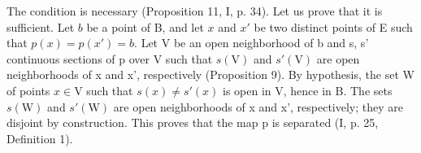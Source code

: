 The condition is necessary (Proposition 11, I, p. 34). Let us prove that it is sufficient. Let \(b\) be a point of B, and let \(x\) and \(x'\) be two distinct points of E such that \(p(x) = p(x') = b\). Let V be an open neighborhood of b and s, s' continuous sections of p over V such that \(s(\mathrm{V})\) and \(s'(\mathrm{V})\) are open neighborhoods of x and x', respectively (Proposition 9). By hypothesis, the set W of points \(x \in \mathrm{V}\) such that \(s(x) \ne s'(x)\) is open in V, hence in B. The sets \(s(\mathrm{W})\) and \(s'(\mathrm{W})\) are open neighborhoods of x and x', respectively; they are disjoint by construction. This proves that the map p is separated (I, p. 25, Definition 1).
\relax{}
